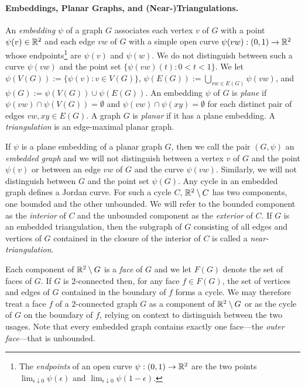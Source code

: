 \documentclass[a4paper,UKenglish,autoref]{lipics-v2021}
\begin{document}
\paragraph{Embeddings, Planar Graphs, and (Near-)Triangulations.}

An \emph{embedding} $\psi$ of a graph $G$ associates each vertex $v$ of $G$ with a point $\psi(v)\in \mathbb{R}^2$ and each edge $vw$ of $G$ with a simple open curve $\psi(vw):(0,1)\to\mathbb{R}^2$ whose endpoints\footnote{The \emph{endpoints} of an open curve $\psi:(0,1)\to\mathbb{R}^2$ are the two points $\lim_{\epsilon\downarrow 0} \psi(\epsilon)$ and $\lim_{\epsilon\downarrow 0}\psi(1-\epsilon)$.} are $\psi(v)$ and $\psi(w)$.  We do not distinguish between such a curve $\psi(vw)$ and the point set $\{\psi(vw)(t):0<t<1\}$.
We let $\psi(V(G)):=\{\psi(v):v\in V(G)\}$, $\psi(E(G)):=\bigcup_{vw\in E(G)} \psi(vw)$, and $\psi(G):=\psi(V(G))\cup\psi(E(G))$.  An embedding $\psi$ of $G$ is \emph{plane} if $\psi(vw)\cap\psi(V(G))=\emptyset$ and $\psi(vw)\cap\psi(xy)=\emptyset$ for each distinct pair of edges $vw,xy\in E(G)$.  A graph $G$ is \emph{planar} if it has a plane embedding. A \emph{triangulation} is an edge-maximal planar graph.

If $\psi$ is a plane embedding of a planar graph $G$, then we call the pair $(G,\psi)$ an \emph{embedded graph} and we will not distinguish between a vertex $v$ of $G$ and the point $\psi(v)$ or between an edge $vw$ of $G$ and the curve $\psi(vw)$.  Similarly, we will not distinguish between $G$ and the  point set $\psi(G)$.  Any cycle in an embedded graph defines a Jordan curve. For such a cycle $C$, $\mathbb{R}^2\setminus C$ has two components, one bounded and the other unbounded. We will refer to the bounded component as the \emph{interior} of $C$ and the unbounded component as the \emph{exterior} of $C$.  If $G$ is an embedded triangulation, then the subgraph of $G$ consisting of all edges and vertices of $G$ contained in the closure of the interior of $C$ is called a \emph{near-triangulation}.

Each component of $\mathbb{R}^2\setminus G$ is a \emph{face} of $G$ and we let $F(G)$ denote the set of faces of $G$.  If $G$ is $2$-connected then, for any face $f\in F(G)$, the set of vertices and edges of $G$ contained in the boundary of $f$ forms a cycle.  We may therefore treat a face $f$ of a $2$-connected graph $G$ as a component of $\mathbb{R}^2\setminus G$ or as the cycle of $G$ on the boundary of $f$, relying on context to distinguish between the two usages.  Note that every embedded graph contains exactly one face---the \emph{outer face}---that is unbounded.
\end{document}
